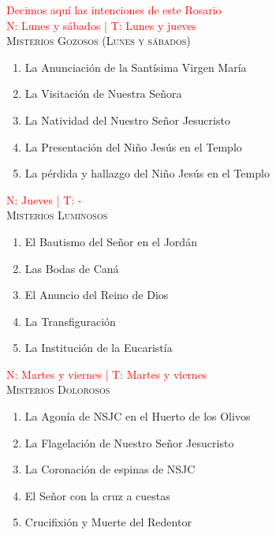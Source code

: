 \documentclass[9pt]{article}
\date{Valladolid (España), \monthyeardate\today}
\begin{document}
\begin{multicols*}{2}

    
    \vspace{1mm}
    \\[2mm]
    \\[1mm]
    \\[1mm]
    \\[1mm]
    \\
    
    \textcolor{red}{Decimos aquí las intenciones de este Rosario}\\

    \small{\textcolor{red}{N: Lunes y sábados | T: Lunes y jueves}}\\
    \textsc{Misterios Gozosos (Lunes y sábados)}
    \begin{enumerate}
        \item La Anunciación de la Santísima Virgen María
        \item La Visitación de Nuestra Señora
        \item La Natividad del Nuestro Señor Jesucristo
        \item La Presentación del Niño Jesús en el Templo
        \item La pérdida y hallazgo del Niño Jesús en el Templo
    \end{enumerate}

    \vspace{2mm}

    \small{\textcolor{red}{N: Jueves | T: -}}\\
    \textsc{Misterios Luminosos}
    \begin{enumerate}
        \item El Bautismo del Señor en el Jordán
        \item Las Bodas de Caná
        \item El Anuncio del Reino de Dios
        \item La Transfiguración
        \item La Institución de la Eucaristía
    \end{enumerate}

    \vspace{2mm}

    \small{\textcolor{red}{N: Martes y viernes | T: Martes y viernes}}\\
    \textsc{Misterios Dolorosos}
    \begin{enumerate}
        \item La Agonía de NSJC en el Huerto de los Olivos
        \item La Flagelación de Nuestro Señor Jesucristo
        \item La Coronación de espinas de NSJC
        \item El Señor con la cruz a cuestas
        \item Crucifixión y Muerte del Redentor
    \end{enumerate}


\end{multicols*}
\end{document}
